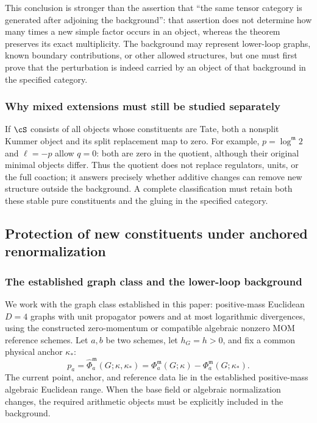 \documentclass[11pt,a4paper,oneside]{article}
\theoremstyle{plain}
\theoremstyle{definition}
\theoremstyle{remark}
\numberwithin{equation}{section}
\begin{document}
This conclusion is stronger than the assertion that ``the same tensor category is generated after adjoining the background'':
that assertion does not determine how many times a new simple factor occurs in an object, whereas the theorem preserves its exact multiplicity.
The background may represent lower-loop graphs, known boundary contributions, or other allowed structures,
but one must first prove that the perturbation is indeed carried by an object of that background in the specified category.

\subsubsection{Why mixed extensions must still be studied separately}
If $\cS$ consists of all objects whose constituents are Tate, both a nonsplit Kummer object and its split replacement map to zero.
For example, $p=\log^{\mathfrak m}2$ and $\ell=-p$ allow $q=0$:
both are zero in the quotient, although their original minimal objects differ.
Thus the quotient does not replace regulators, units, or the full coaction;
it answers precisely whether additive changes can remove new structure outside the background.
A complete classification must retain both these stable pure constituents and the gluing in the specified category.


\subsection{Protection of new constituents under anchored renormalization}
\subsubsection{The established graph class and the lower-loop background}
We work with the graph class established in this paper: positive-mass Euclidean $D=4$ graphs with unit propagator powers and at most logarithmic divergences,
using the constructed zero-momentum or compatible algebraic nonzero MOM reference schemes.
Let $a,b$ be two schemes, let $h_G=h>0$, and fix a common physical anchor $\kappa_*$:
\[
 p_a=\widehat\Phi_a^{\mathfrak m}(G;\kappa,\kappa_*)
 =\Phi_a^{\mathfrak m}(G;\kappa)-\Phi_a^{\mathfrak m}(G;\kappa_*).
\]
The current point, anchor, and reference data lie in the established positive-mass algebraic Euclidean range.
When the base field or algebraic normalization changes, the required arithmetic objects must be explicitly included in the background.
\end{document}

